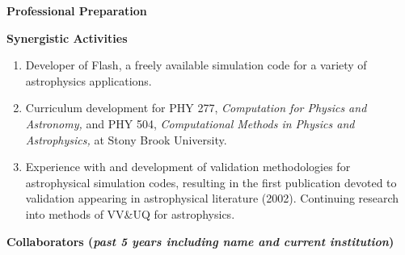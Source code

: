 \documentclass[11pt,letterpaper,english]{article}
\begin{document}
{\begin{flushleft} {\bf Professional Preparation}
{}


\vspace{.06in}
{\bf Synergistic Activities}
\vspace{-6pt}
\begin{enumerate} \itemsep1pt \parskip0pt 

\item Developer of Flash, a freely available simulation code for
a variety of astrophysics applications. \\
\item Curriculum development for PHY 277, {\em Computation for Physics and
Astronomy,} and PHY 504, {\em Computational Methods in Physics and Astrophysics,} 
at Stony Brook University. \\
\item Experience with and development of validation methodologies for
astrophysical simulation codes, resulting in the first publication
devoted to validation appearing in astrophysical literature (2002).
Continuing research into methods of VV\&UQ for astrophysics. \\
\end{enumerate} 

\vspace{-6pt}
{\bf Collaborators ({\emph{past 5 years including name and current institution}})} 
{\parindent 16pt

}
\end{flushleft}}
\end{document}
